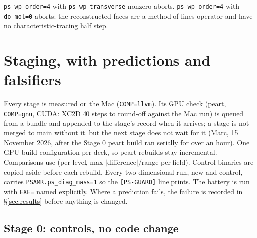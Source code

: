 \documentclass[11pt,a4paper]{article}
\newcommand{\code}[1]{\texttt{\small #1}}
\begin{document}
\code{ps\_wp\_order=4} with \code{ps\_wp\_transverse} nonzero aborts.
\code{ps\_wp\_order=4} with \code{do\_mol=0} aborts: the reconstructed
faces are a method-of-lines operator and have no characteristic-tracing
half step.

\section{Staging, with predictions and falsifiers}
\label{sec:stages}

Every stage is measured on the Mac (\code{COMP=llvm}).  Its GPU check
(peart, \code{COMP=gnu}, CUDA: XC2D 40 steps to round-off against the Mac
run) is queued from a bundle and appended to the stage's record when it
arrives; a stage is not merged to main without it, but the next stage does
not wait for it (Marc, 15 November 2026, after the Stage 0 peart build ran
serially for over an hour).  One GPU build configuration per deck, so
peart rebuilds stay incremental.  Comparisons use
 (per level,
max $|$difference$|$/range per field).  Control binaries are copied aside
before each rebuild.  Every two-dimensional run, new and control, carries
\code{PSAMR.ps\_diag\_mass=1} so the \code{[PS-GUARD]} line prints.  The
battery is run with \code{EXE=} named explicitly.  Where a prediction
fails, the failure is recorded in \S\ref{sec:results} before anything is
changed.

\subsection*{Stage 0: controls, no code change}
\end{document}
